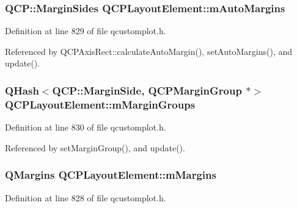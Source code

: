 \subsubsection[{m\+Auto\+Margins}]{\setlength{\rightskip}{0pt plus 5cm}Q\+C\+P\+::\+Margin\+Sides Q\+C\+P\+Layout\+Element\+::m\+Auto\+Margins\hspace{0.3cm}{\ttfamily [protected]}}\label{class_q_c_p_layout_element_af61c70354d1275778d68206b2a1b2d36}


Definition at line 829 of file qcustomplot.\+h.



Referenced by Q\+C\+P\+Axis\+Rect\+::calculate\+Auto\+Margin(), set\+Auto\+Margins(), and update().

\hypertarget{class_q_c_p_layout_element_ae027b5caf347c2fb635e797513712a32}{}
\subsubsection[{m\+Margin\+Groups}]{\setlength{\rightskip}{0pt plus 5cm}Q\+Hash$<${\bf Q\+C\+P\+::\+Margin\+Side}, {\bf Q\+C\+P\+Margin\+Group} $\ast$$>$ Q\+C\+P\+Layout\+Element\+::m\+Margin\+Groups\hspace{0.3cm}{\ttfamily [protected]}}\label{class_q_c_p_layout_element_ae027b5caf347c2fb635e797513712a32}


Definition at line 830 of file qcustomplot.\+h.



Referenced by set\+Margin\+Group(), and update().

\hypertarget{class_q_c_p_layout_element_ac2a32b99ee527ca5dfff9da03628fe94}{}
\subsubsection[{m\+Margins}]{\setlength{\rightskip}{0pt plus 5cm}Q\+Margins Q\+C\+P\+Layout\+Element\+::m\+Margins\hspace{0.3cm}{\ttfamily [protected]}}\label{class_q_c_p_layout_element_ac2a32b99ee527ca5dfff9da03628fe94}


Definition at line 828 of file qcustomplot.\+h.



